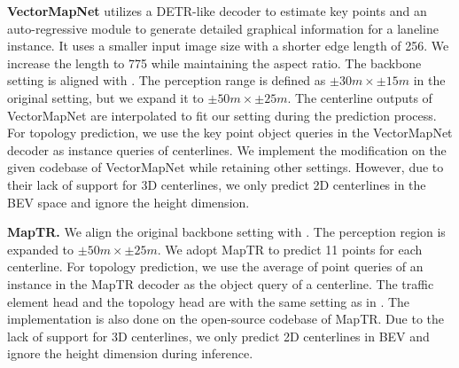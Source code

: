 \smallskip
\noindent
\textbf{VectorMapNet} utilizes a DETR-like decoder to estimate key points and an auto-regressive module to generate detailed graphical information for a laneline instance.
It uses a smaller input image size with a shorter edge length of 256.
We increase the length to 775 while maintaining the aspect ratio.
The backbone setting is aligned with \algname.
The perception range is defined as $\pm30\textit{m} \times \pm15\textit{m}$ in the original setting, but we expand it to
$\pm50\textit{m} \times \pm25\textit{m}$.
The centerline outputs of VectorMapNet are interpolated to fit our setting during the prediction process.
For topology prediction, we use the key point object queries in the VectorMapNet decoder as instance queries of centerlines. 
We implement the modification on the given codebase of VectorMapNet while retaining other settings.
However, due to their lack of support for 3D centerlines, we only predict 2D centerlines in the BEV space and ignore the height dimension.


\smallskip
\noindent
\textbf{MapTR.}
We align the original backbone setting with \algname. 
The perception region is expanded to $\pm50\textit{m} \times \pm25\textit{m}$.
We adopt MapTR to predict 11 points for each centerline. 
For topology prediction, we use the average of point queries of an instance in the MapTR decoder as the object query of a centerline. The traffic element head and the topology head are with the same setting as in \algname. 
The implementation is also done on the open-source codebase of MapTR.
Due to the lack of support for 3D centerlines, we only predict 2D centerlines in BEV and ignore the height dimension during inference.



